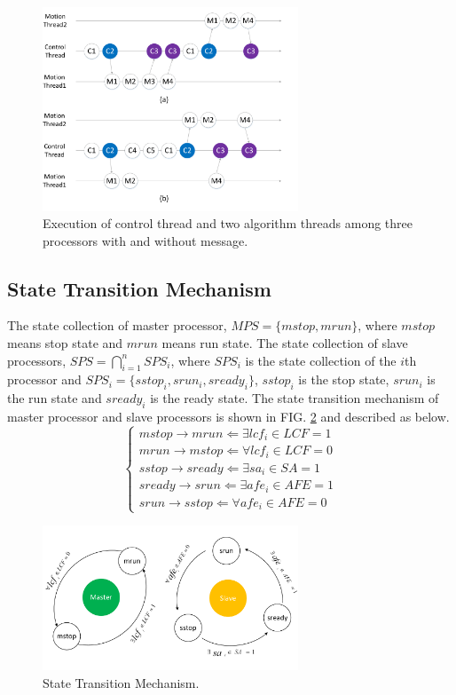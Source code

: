 \documentclass[journal,UTF8]{IEEEtran}
\begin{document}
  
  \begin{figure}
  	\centering
  	\includegraphics[width=3in]{fig/threadFlow.pdf}
  	\caption{ Execution of control thread and two algorithm threads among three processors with and without message.}
  	\label{fig:threadFlow}
  \end{figure}
 \subsection{State Transition Mechanism}
 The state collection of master processor, $MPS = \{mstop, mrun\}$, where $mstop$ means stop state and $mrun$ means run state. The state collection of slave processors, $SPS = \bigcap_{i=1}^{n} SPS_{i}$, where $SPS_{i}$ is the state collection of the $i$th processor and $SPS_{i} = \{sstop_{i}, srun_{i}, sready_{i}\}$, $sstop_{i}$ is the stop state, $srun_{i}$ is the run state and $sready_{i}$ is the ready state. The state transition mechanism of master processor and slave processors is shown in FIG. \ref{fig:state} and described as below.
\begin{equation}
\left\{
\begin{array}{l}
 mstop \to mrun \Leftarrow\exists lcf_i \in LCF = 1\\
 mrun \to mstop \Leftarrow\forall lcf_i \in LCF = 0\\
 sstop \to sready \Leftarrow\exists sa_{i} \in SA = 1\\
 sready \to srun \Leftarrow\exists afe_{i}\in AFE = 1\\
 srun \to sstop \Leftarrow\forall afe_{i}\in AFE = 0
\end{array}
\right.
\end{equation}

 \begin{figure}
	\centering
	\includegraphics[width=3in]{fig/state.pdf}
	\caption{ State Transition Mechanism.}
	\label{fig:state}
\end{figure}
\end{document}
